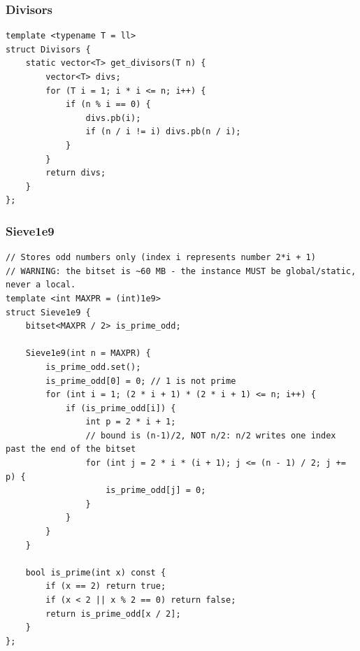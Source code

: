 \documentclass[9pt,a4paper,twocolumn]{extarticle}
\begin{document}
\filbreak
\subsubsection{Divisors}
\nopagebreak
\begin{lstlisting}
template <typename T = ll>
struct Divisors {
    static vector<T> get_divisors(T n) {
        vector<T> divs;
        for (T i = 1; i * i <= n; i++) {
            if (n % i == 0) {
                divs.pb(i);
                if (n / i != i) divs.pb(n / i);
            }
        }
        return divs;
    }
};
\end{lstlisting}

\filbreak
\subsubsection{Sieve1e9}
\nopagebreak
\begin{lstlisting}
// Stores odd numbers only (index i represents number 2*i + 1)
// WARNING: the bitset is ~60 MB - the instance MUST be global/static, never a local.
template <int MAXPR = (int)1e9>
struct Sieve1e9 {
    bitset<MAXPR / 2> is_prime_odd;

    Sieve1e9(int n = MAXPR) {
        is_prime_odd.set();
        is_prime_odd[0] = 0; // 1 is not prime
        for (int i = 1; (2 * i + 1) * (2 * i + 1) <= n; i++) {
            if (is_prime_odd[i]) {
                int p = 2 * i + 1;
                // bound is (n-1)/2, NOT n/2: n/2 writes one index past the end of the bitset
                for (int j = 2 * i * (i + 1); j <= (n - 1) / 2; j += p) {
                    is_prime_odd[j] = 0;
                }
            }
        }
    }

    bool is_prime(int x) const {
        if (x == 2) return true;
        if (x < 2 || x % 2 == 0) return false;
        return is_prime_odd[x / 2];
    }
};
\end{lstlisting}

\filbreak
\end{document}
